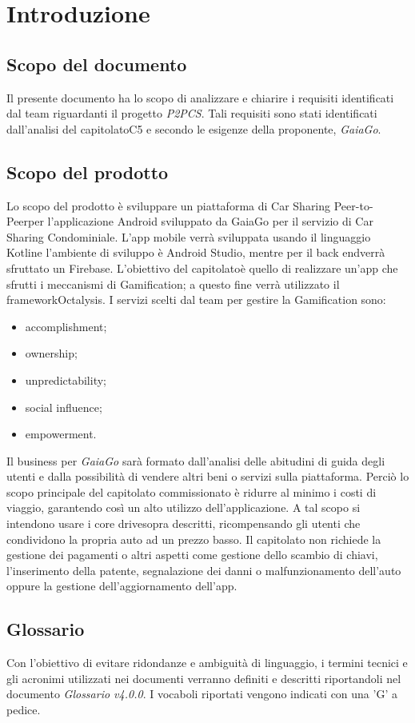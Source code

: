 \section{Introduzione} 
\subsection{Scopo del documento}
Il presente documento ha lo scopo di analizzare e chiarire i requisiti identificati dal team riguardanti il progetto \textit{P2PCS}. Tali requisiti sono stati identificati dall'analisi del capitolato\glosp C5 e secondo le esigenze della proponente, \textit{GaiaGo}.
\subsection{Scopo del prodotto}
Lo scopo del prodotto è sviluppare un piattaforma di Car Sharing Peer-to-Peer\glosp  per l'applicazione Android sviluppato da GaiaGo per il servizio di Car Sharing Condominiale. L'app mobile verrà sviluppata usando il linguaggio Kotlin\glosp e l'ambiente di sviluppo è Android Studio, mentre per il back end\glosp verrà sfruttato un Firebase\glo. L'obiettivo del capitolato\glosp è quello di realizzare un'app che sfrutti i meccanismi di Gamification\glo; a questo fine verrà utilizzato il framework\glosp Octalysis\glo. I servizi scelti dal team per gestire la Gamification sono:
\begin{itemize}
	\item {accomplishment};
	\item {ownership};
	\item {unpredictability};
	\item {social influence};
	\item {empowerment}.
\end{itemize}
Il business per \textit{GaiaGo} sarà formato dall'analisi delle abitudini di guida degli utenti e dalla possibilità di vendere altri beni o servizi sulla piattaforma. Perciò lo scopo principale del capitolato commissionato è ridurre al minimo i costi di viaggio, garantendo così un alto utilizzo dell'applicazione. 
A tal scopo si intendono usare i core drive\glosp sopra descritti, ricompensando gli utenti che condividono la propria auto ad un prezzo basso. Il capitolato non richiede la gestione dei pagamenti o altri aspetti come gestione dello scambio di chiavi, l'inserimento della patente, segnalazione dei danni o malfunzionamento dell'auto oppure la gestione dell'aggiornamento dell'app.

\subsection{Glossario}
Con l’obiettivo di evitare ridondanze e ambiguità di linguaggio, i termini tecnici e gli acronimi utilizzati nei documenti verranno definiti e descritti riportandoli nel documento \textit{Glossario v4.0.0}.  I vocaboli riportati vengono indicati con una 'G' a pedice.
